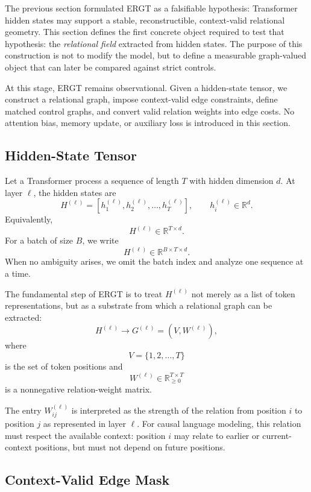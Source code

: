 \documentclass[11pt]{article}
\begin{document}
The previous section formulated ERGT as a falsifiable hypothesis: Transformer hidden states may support a stable, reconstructible, context-valid relational geometry. This section defines the first concrete object required to test that hypothesis: the \emph{relational field} extracted from hidden states. The purpose of this construction is not to modify the model, but to define a measurable graph-valued object that can later be compared against strict controls.

At this stage, ERGT remains observational. Given a hidden-state tensor, we construct a relational graph, impose context-valid edge constraints, define matched control graphs, and convert valid relation weights into edge costs. No attention bias, memory update, or auxiliary loss is introduced in this section.

\subsection{Hidden-State Tensor}

Let a Transformer process a sequence of length $T$ with hidden dimension $d$. At layer $\ell$, the hidden states are
\[
H^{(\ell)}
=
[h_1^{(\ell)},h_2^{(\ell)},\ldots,h_T^{(\ell)}],
\qquad
h_i^{(\ell)}\in\mathbb{R}^d.
\]
Equivalently,
\[
H^{(\ell)}\in\mathbb{R}^{T\times d}.
\]
For a batch of size $B$, we write
\[
H^{(\ell)}\in\mathbb{R}^{B\times T\times d}.
\]
When no ambiguity arises, we omit the batch index and analyze one sequence at a time.

The fundamental step of ERGT is to treat $H^{(\ell)}$ not merely as a list of token representations, but as a substrate from which a relational graph can be extracted:
\[
H^{(\ell)}\longrightarrow G^{(\ell)}=(V,W^{(\ell)}),
\]
where
\[
V=\{1,2,\ldots,T\}
\]
is the set of token positions and
\[
W^{(\ell)}\in\mathbb{R}_{\geq 0}^{T\times T}
\]
is a nonnegative relation-weight matrix.

The entry $W_{ij}^{(\ell)}$ is interpreted as the strength of the relation from position $i$ to position $j$ as represented in layer $\ell$. For causal language modeling, this relation must respect the available context: position $i$ may relate to earlier or current-context positions, but must not depend on future positions.

\subsection{Context-Valid Edge Mask}
\end{document}
